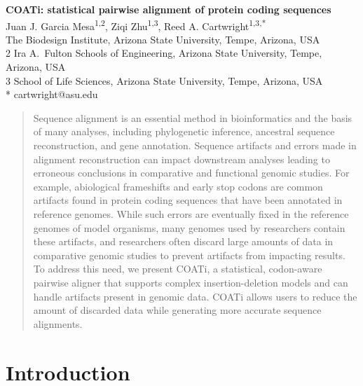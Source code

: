 \documentclass[12pt,letterpaper]{article}
\begin{document}


\begin{flushleft}
{\Large\textbf{COATi: statistical pairwise alignment of protein coding sequences}}
\newline
\\
Juan J. Garcia Mesa\textsuperscript{1,2},
Ziqi Zhu\textsuperscript{1,3},
Reed A. Cartwright\textsuperscript{1,3,*}
\\
 The Biodesign Institute, Arizona State University, Tempe, Arizona, USA
\\
2 Ira A.\ Fulton Schools of Engineering, Arizona State University, Tempe, Arizona, USA
\\
3 School of Life Sciences, Arizona State University, Tempe, Arizona, USA
\\
\bigskip
* cartwright@asu.edu

\end{flushleft}

\begin{abstract}
\noindent
Sequence alignment is an essential method in bioinformatics and the basis of many analyses, including phylogenetic inference, ancestral sequence reconstruction, and gene annotation.
Sequence artifacts and errors made in alignment reconstruction can impact downstream analyses leading to erroneous conclusions in comparative and functional genomic studies.
For example, abiological frameshifts and early stop codons are common artifacts found in protein coding sequences that have been annotated in reference genomes.
While such errors are eventually fixed in the reference genomes of model organisms, many genomes used by researchers contain these artifacts, and researchers often discard large amounts of data in comparative genomic studies to prevent artifacts from impacting results.
To address this need, we present COATi, a statistical, codon-aware pairwise aligner that supports complex insertion-deletion models and can handle artifacts present in genomic data.
COATi allows users to reduce the amount of discarded data while generating more accurate sequence alignments.
\end{abstract}


\linenumbers

\section*{Introduction}
\end{document}
